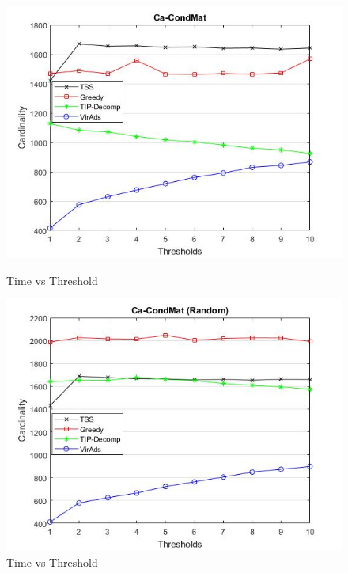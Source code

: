 \begin{figure}[h!]
\begin{minipage}[t]{0.50\textwidth}
\includegraphics[width=\linewidth,keepaspectratio=true]{images/ca-condmattime.jpg}
\caption{Time vs Threshold}
\label{fase1}
\end{minipage}
\begin{minipage}[t]{0.50\textwidth}
\includegraphics[width=\linewidth,keepaspectratio=true]{images/ca-condmatrandomtime.jpg}
\caption{Time vs Threshold}
\end{minipage}
\end{figure}

